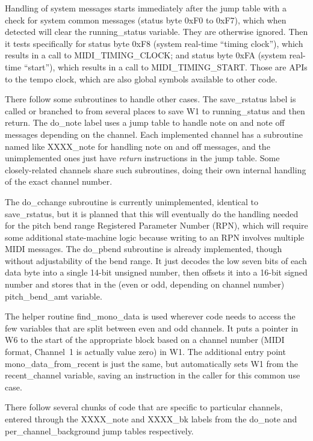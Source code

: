 Handling of system messages starts immediately after the jump table with a
check for system common messages (status byte 0xF0 to 0xF7), which when
detected will clear the running\_status variable.  They are otherwise
ignored.  Then it tests specifically for status byte 0xF8 (system real-time
``timing clock''), which results in a call to MIDI\_TIMING\_CLOCK; and
status byte 0xFA (system real-time ``start''), which results in a call to
MIDI\_TIMING\_START.  Those are APIs to the tempo clock, which are also
global symbols available to other code.

There follow some subroutines to handle other cases.  The save\_rstatus
label is called or branched to from several places to save W1 to
running\_status and then return.  The do\_note label uses a jump table to
handle note on and note off messages depending on the channel.  Each
implemented channel has a subroutine named like XXXX\_note for
handling note on and off messages, and the unimplemented ones just have
\emph{return} instructions in the jump table.  Some closely-related channels
share such subroutines, doing their own internal handling of the exact
channel number.

The do\_cchange subroutine is currently unimplemented, identical to
save\_rstatus, but it is planned that this will eventually do the handling
needed for the pitch bend range Registered Parameter Number (RPN), which
will require some additional state-machine logic because writing to an RPN
involves multiple MIDI messages.  The do\_pbend subroutine is already
implemented, though without adjustability of the bend range.  It just
decodes the low seven bits of each data byte into a single 14-bit unsigned
number, then offsets it into a 16-bit signed number and stores that in the
(even or odd, depending on channel number) pitch\_bend\_amt variable.

The helper routine find\_mono\_data is used wherever code needs to access
the few variables that are split between even and odd channels.  It puts a
pointer in W6 to the start of the appropriate block based on a channel
number (MIDI format, Channel~1 is actually value zero) in W1.  The
additional entry point mono\_data\_from\_recent is just the same, but
automatically sets W1 from the recent\_channel variable, saving an
instruction in the caller for this common use case.

There follow several chunks of code that are specific to particular
channels, entered through the XXXX\_note and XXXX\_bk labels from the
do\_note and per\_channel\_background jump tables respectively.

